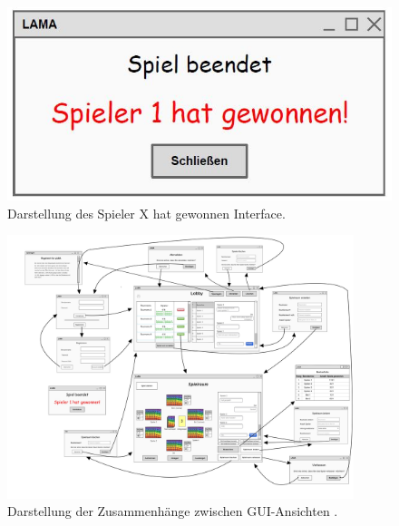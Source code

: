 \begin{figure}[h]
	\centering
	\includegraphics[width=\textwidth]{img/gewonnen.JPG}
	\caption{Darstellung des Spieler X hat gewonnen Interface.}
	\label{gui:gewonnen} %
\end{figure}

\begin{figure}[h]
	\centering
	\includegraphics[width=0.9\textwidth,height=0.6\textwidth]{img/gui-zusammenhang.jpg}
	\caption{Darstellung der Zusammenhänge zwischen GUI-Ansichten .}
	\label{gui:zusammenhang}
\end{figure}


